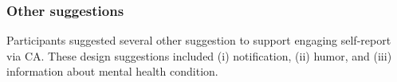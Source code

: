         


    
\subsubsection{Other suggestions}
        Participants suggested several other suggestion to support engaging self-report via \ac{CA}. These design suggestions included 
            (i) notification, 
            (ii) humor, and
            (iii) information about mental health condition.
        
